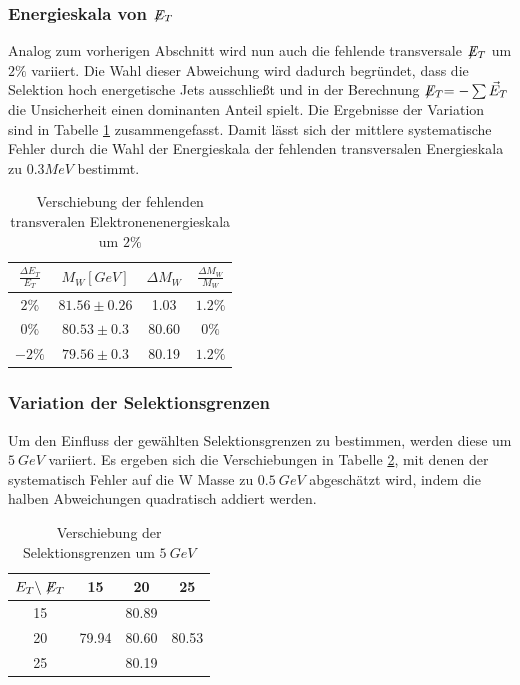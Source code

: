 \documentclass[a4paper,12pt]{article}
\newcommand{\met}{\ensuremath{\not\mathrel{E}}_T}
\begin{document}
\subsubsection*{Energieskala von $\met$}
Analog zum vorherigen Abschnitt wird nun auch die fehlende transversale $\met$ um $2\%$  variiert. Die Wahl dieser Abweichung wird dadurch begründet, dass
die Selektion hoch energetische Jets ausschließt und in der Berechnung $\met = - \sum \vec{E}_{T}$ die Unsicherheit einen dominanten Anteil spielt.
Die Ergebnisse der Variation sind in Tabelle \ref{tab:sysmet} zusammengefasst. Damit lässt sich der mittlere systematische Fehler durch die 
Wahl der Energieskala der fehlenden transversalen Energieskala zu $0.3MeV$ bestimmt.
\begin{table}[h]
	\centering
	\begin{tabular}{c| c c c}
		$\frac{\Delta E_{T}}{E_{T}}$ & $M_{W} [GeV]$ & $\Delta M_{W}$ &$\frac{\Delta M_{W}}{M_{W}}$\\
		\hline
		$2\%$ & $81.56\pm 0.26$ & 1.03 & $1.2\%$\\
		$0\%$ & $80.53\pm 0.3$ & 80.60 & $0\%$ \\
		$-2\%$ & $79.56\pm 0.3$ & 80.19 &$1.2\%$ 
	\end{tabular}
	\caption{Verschiebung der fehlenden transveralen Elektronenenergieskala um $2\%$}
	\label{tab:sysmet}
\end{table}
\subsubsection*{Variation der Selektionsgrenzen}
Um den Einfluss der gewählten Selektionsgrenzen zu bestimmen, werden diese um $\SI{5}{GeV}$
variiert. Es ergeben sich die Verschiebungen in Tabelle \ref{tab:variation}, mit denen der systematisch Fehler
auf die W Masse zu $\SI{0.5}{GeV}$ abgeschätzt wird, indem die halben Abweichungen quadratisch addiert werden.
\begin{table}[h]
	\centering
	\begin{tabular}{c| c c c}
		$E_{T} \backslash \met$ & 15 & 20 & 25 \\
		\hline
		15 &  & 80.89 & \\
		20 & 79.94 & 80.60 & 80.53 \\
		25 &  & 80.19 &
	\end{tabular}
	\caption{Verschiebung der Selektionsgrenzen um $\SI{5}{GeV}$}
	\label{tab:variation}
\end{table}
\end{document}
